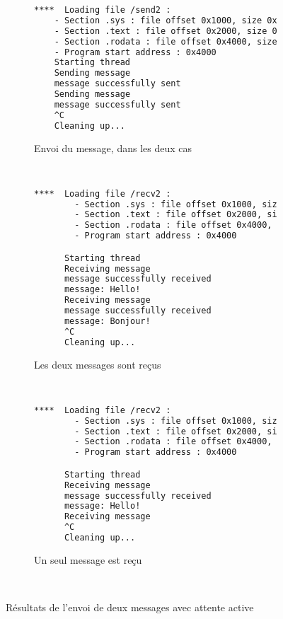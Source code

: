 \documentclass{article}
\begin{document}
\begin{figure}
  \begin{subfigure}[b]{\textwidth}
    \begin{lstlisting}[language=bash]
      ****  Loading file /send2 :
  	- Section .sys : file offset 0x1000, size 0x230, addr 0x4000, R/X
  	- Section .text : file offset 0x2000, size 0x1958, addr 0x400000, R/X
  	- Section .rodata : file offset 0x4000, size 0x6c, addr 0x404000, R
  	- Program start address : 0x4000
    Starting thread
    Sending message
    message successfully sent
    Sending message
    message successfully sent
    ^C
    Cleaning up...
    \end{lstlisting}
    \caption{Envoi du message, dans les deux cas}\label{busy:send}
  \end{subfigure}
  \\
  \begin{subfigure}[b]{\textwidth}
    \begin{lstlisting}[language=bash]
      ****  Loading file /recv2 :
      	- Section .sys : file offset 0x1000, size 0x230, addr 0x4000, R/X
      	- Section .text : file offset 0x2000, size 0x1998, addr 0x400000, R/X
      	- Section .rodata : file offset 0x4000, size 0x6c, addr 0x404000, R
      	- Program start address : 0x4000

      Starting thread
      Receiving message
      message successfully received
      message: Hello!
      Receiving message
      message successfully received
      message: Bonjour!
      ^C
      Cleaning up...

    \end{lstlisting}
    \caption{Les deux messages sont reçus}\label{busy:recv1}
  \end{subfigure}
  \\
  \begin{subfigure}[b]{\textwidth}
    \begin{lstlisting}[language=bash]
      ****  Loading file /recv2 :
      	- Section .sys : file offset 0x1000, size 0x230, addr 0x4000, R/X
      	- Section .text : file offset 0x2000, size 0x1998, addr 0x400000, R/X
      	- Section .rodata : file offset 0x4000, size 0x6c, addr 0x404000, R
      	- Program start address : 0x4000

      Starting thread
      Receiving message
      message successfully received
      message: Hello!
      Receiving message
      ^C
      Cleaning up...
    \end{lstlisting}
    \caption{Un seul message est reçu}\label{busy:recv2}
  \end{subfigure}
  \\
  \caption{Résultats de l'envoi de deux messages avec attente active}\label{busy}
\end{figure}
\end{document}
